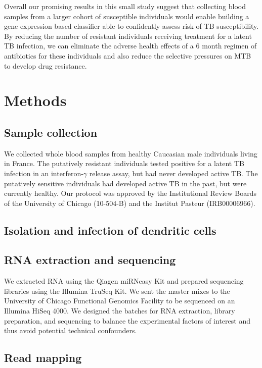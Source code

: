 \documentclass[fleqn,10pt]{wlscirep}
\begin{document}
Overall our promising results in this small study suggest that collecting blood samples from a larger cohort of susceptible individuals would enable building a gene expression based classifier able to confidently assess risk of TB susceptibility. By reducing the number of resistant individuals receiving treatment for a latent TB infection, we can eliminate the adverse health effects of a 6 month regimen of antibiotics for these individuals and also reduce the selective pressures on MTB to develop drug resistance.
\section*{Methods}

\subsection*{Sample collection}

We collected whole blood samples from healthy Caucasian male individuals living in France. The putatively resistant individuals tested positive for a latent TB infection in an interferon-$\gamma$ release assay, but had never developed active TB. The putatively sensitive individuals had developed active TB in the past, but were currently healthy. Our protocol was approved by the Institutional Review Boards of the University of Chicago (10-504-B) and the Institut Pasteur (IRB00006966).
\subsection*{Isolation and infection of dendritic cells}


\subsection*{RNA extraction and sequencing}

We extracted RNA using the Qiagen miRNeasy Kit and prepared sequencing libraries using the Illumina TruSeq Kit. We sent the master mixes to the University of Chicago Functional Genomics Facility to be sequenced on an Illumina HiSeq 4000. We designed the batches for RNA extraction, library preparation, and sequencing to balance the experimental factors of interest and thus avoid potential technical confounders.
\subsection*{Read mapping}
\end{document}
